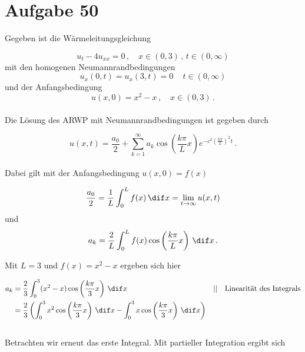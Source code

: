 \section{Aufgabe 50}

Gegeben ist die Wärmeleitungsgleichung

\begin{equation*}
    u_t - 4u_{xx} = 0\,, \quad x \in (0,3)\,,\, t \in (0,\infty)
\end{equation*}
mit den homogenen Neumannrandbedingungen
\begin{equation*}
    u_x(0,t) = u_x(3,t) = 0\, \quad t \in (0,\infty)
\end{equation*}
und der Anfangsbedingung
\begin{equation*}
    u(x,0) = x^2-x\,, \quad x \in (0,3) \,.
\end{equation*} \\

Die Lösung des ARWP mit Neumannrandbedingungen ist gegeben durch

\begin{equation*}
    u(x,t) = \frac{a_0}{2} + \sum_{k=1}^\infty a_k \cos\left(\frac{k\pi}{L}x\right) e^{-c^2\left(\frac{k\pi}{L}\right)^2t} \,.
\end{equation*} \\

Dabei gilt mit der Anfangsbedingung $u(x,0) = f(x)$

\begin{equation*}
    \frac{a_0}{2} = \frac{1}{L} \int_0^Lf(x) \,\dif x = \lim_{t \rightarrow \infty} u(x,t)
\end{equation*}
und
\begin{equation*}
    a_k = \frac{2}{L} \int_0^L f(x) \cos\left(\frac{k\pi}{L}x \right) \,\dif x \,.
\end{equation*} 

\newpage

Mit $L=3$ und $f(x) = x^2 - x$ ergeben sich hier

\begin{align*}
    a_k &= \frac{2}{3} \int_0^3 (x^2-x) \cos \left(\frac{k\pi}{3}x\right) \,\dif x && || \quad \text{Linearität des Integrals} \\
        &= \frac{2}{3} \left(\int_0^3 x^2 \cos \left(\frac{k\pi}{3}x\right) \,\dif x  - \int_0^3 x \cos \left(\frac{k\pi}{3}x\right) \,\dif x\right)
\end{align*} \\

Betrachten wir erneut das erste Integral. Mit partieller Integration ergibt sich

